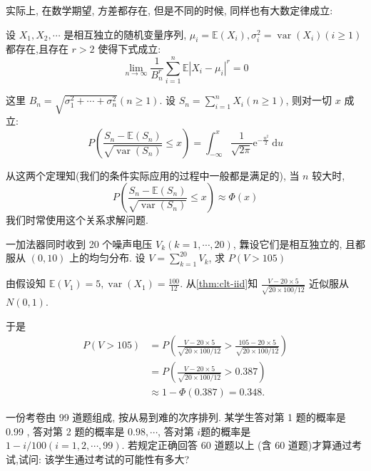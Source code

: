     实际上, 在数学期望, 方差都存在, 但是不同的时候, 同样也有大数定律成立: 

    \begin{theorem}
        \label{thm:clt-gen}
        设 $X_1, X_2, \cdots$ 是相互独立的随机变量序列, $\mu_i=\mathbb{E}\left(X_i\right), \sigma_i^2=\operatorname{var}\left(X_i\right)(i \geq 1)$ 都存在,且存在 $r>2$ 使得下式成立:
$$
\lim _{n \rightarrow \infty} \frac{1}{B_n^r} \sum_{i=1}^n \mathbb{E}\left|X_i-\mu_i\right|^r=0
$$

这里 $B_n=\sqrt{\sigma_1^2+\cdots+\sigma_n^2}(n \geq 1)$. 设 $S_n=\sum_{i=1}^n X_i(n \geq 1)$, 则对一切 $x$ 成立:
$$
P\left(\frac{S_n-\mathbb{E}\left(S_n\right)}{\sqrt{\operatorname{var}\left(S_n\right)}} \leq x\right)=\int_{-\infty}^x \frac{1}{\sqrt{2 \pi}} \mathrm{e}^{-\frac{u^2}{2}} \mathrm{~d} u
$$
    \end{theorem}

    从这两个定理知(我们的条件实际应用的过程中一般都是满足的), 当 $n$ 较大时,
$$
P\left(\frac{S_n-\mathbb{E}\left(S_n\right)}{\sqrt{\operatorname{var}\left(S_n\right)}} \leq x\right) \approx \Phi(x)
$$
     我们时常使用这个关系求解问题. 

     \begin{example}
        一加法器同时收到 20 个噪声电压 $V_k(k=1, \cdots, 20)$, 橆设它们是相互独立的, 且都服从 $(0,10)$ 上的均匀分布. 设 $V=\sum_{k=1}^{20} V_k$, 求 $P(V>105)$
     \end{example}

     \begin{solution}
        由假设知 $\mathbb{E}\left(V_1\right)=5, \operatorname{var}\left(X_1\right)=\frac{100}{12}$. 从\cref{thm:clt-iid}知 $\frac{V-20 \times 5}{\sqrt{20 \times 100 / 12}}$ 近似服从 $N(0,1)$.

        于是
        $$
        \begin{aligned}
        P(V>105) & =P\left(\frac{V-20 \times 5}{\sqrt{20 \times 100 / 12}}>\frac{105-20 \times 5}{\sqrt{20 \times 100 / 12}}\right) \\
        & =P\left(\frac{V-20 \times 5}{\sqrt{20 \times 100 / 12}}>0.387\right) \\
        & \approx 1-\Phi(0.387)=0.348 .
        \end{aligned}
        $$ 
     \end{solution}


     \begin{example}
        一份考卷由 99 道题组成, 按从易到难的次序排列. 某学生答对第 1 题的概率是 0.99 , 答对第 2 题的概率是 $0.98, \cdots$, 答对第 $i$题的概率是 $1-i / 100(i=1,2, \cdots, 99)$. 若规定正确回答 60 道题以上 (含 60 道题)才算通过考试,试问: 该学生通过考试的可能性有多大?
     \end{example}


